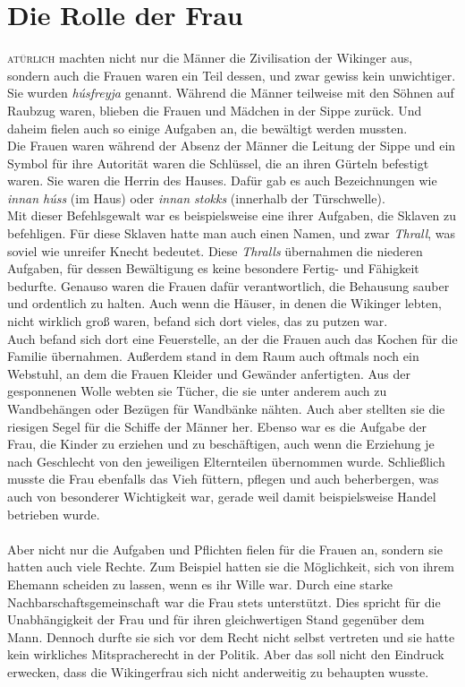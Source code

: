 \documentclass[12pt,a4paper,ngerman,openany]{book}
\newcommand{\flettrine}[2]{\lettrine[lines=2, depth=0, loversize=0.25, nindent=0.69pt, lraise=0.15]{\initfamily{#1}}{#2}}
\newcommand*\initfamily{\usefont{U}{GotIn}{xl}{n}}
\begin{document}
\newpage

\section{Die Rolle der Frau}
\flettrine{N}{atürlich} machten nicht nur die Männer die Zivilisation der Wikinger aus, sondern auch die Frauen waren ein Teil dessen, und zwar gewiss kein unwichtiger. Sie wurden \textit{húsfreyja} genannt. Während die Männer teilweise mit den Söhnen auf Raubzug waren, blieben die Frauen und Mädchen in der Sippe zurück. Und daheim fielen auch so einige Aufgaben an, die bewältigt werden mussten.\\
Die Frauen waren während der Absenz der Männer die Leitung der Sippe und ein Symbol für ihre Autorität waren die Schlüssel, die an ihren Gürteln befestigt waren. Sie waren die Herrin des Hauses. Dafür gab es auch Bezeichnungen wie \textit{innan húss} (im Haus) oder \textit{innan stokks} (innerhalb der Türschwelle).\\
Mit dieser Befehlsgewalt war es beispielsweise eine ihrer Aufgaben, die Sklaven zu befehligen. Für diese Sklaven hatte man auch einen Namen, und zwar \textit{Thrall}, was soviel wie \glqq unreifer Knecht\grqq{} bedeutet. Diese \textit{Thralls} übernahmen die niederen Aufgaben, für dessen Bewältigung es keine besondere Fertig- und Fähigkeit bedurfte.
Genauso waren die Frauen dafür verantwortlich, die Behausung sauber und ordentlich zu halten. Auch wenn die Häuser, in denen die Wikinger lebten, nicht wirklich groß waren,
befand sich dort vieles, das zu putzen war.\\
Auch befand sich dort eine Feuerstelle, an der die Frauen auch das Kochen für die Familie übernahmen. Außerdem stand in dem Raum auch oftmals noch ein Webstuhl, an dem die Frauen Kleider und Gewänder anfertigten. Aus der gesponnenen Wolle webten sie Tücher, die sie unter anderem auch zu Wandbehängen oder Bezügen für Wandbänke nähten. Auch aber stellten sie die riesigen Segel für die Schiffe der Männer her.
Ebenso war es die Aufgabe der Frau, die Kinder zu erziehen und zu beschäftigen, auch wenn die Erziehung je nach Geschlecht von den jeweiligen Elternteilen übernommen wurde.
Schließlich musste die Frau ebenfalls das Vieh füttern, pflegen und auch beherbergen, was auch von besonderer Wichtigkeit war, gerade weil damit beispielsweise Handel betrieben wurde.\\\\
Aber nicht nur die Aufgaben und Pflichten fielen für die Frauen an, sondern sie hatten auch viele Rechte. Zum Beispiel hatten sie die Möglichkeit, sich von ihrem Ehemann scheiden zu lassen, wenn es ihr Wille war. Durch eine starke Nachbarschaftsgemeinschaft war die Frau stets unterstützt. Dies spricht für die Unabhängigkeit der Frau und für ihren gleichwertigen Stand gegenüber dem Mann. Dennoch durfte sie sich vor dem Recht nicht selbst vertreten und sie hatte kein wirkliches Mitspracherecht in der Politik. Aber das soll nicht den Eindruck erwecken, dass die Wikingerfrau sich nicht anderweitig zu behaupten wusste.\\
\end{document}
